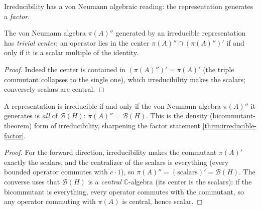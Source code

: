Irreducibility has a von Neumann algebraic reading: the representation generates a \emph{factor}.

\begin{theorem}
    \label{thrm:irreducible-factor}
    \leanok
    The von Neumann algebra $\pi(A)''$ generated by an irreducible representation has \emph{trivial center}: an operator lies in the center $\pi(A)'' \cap (\pi(A)'')'$ if and only if it is a scalar multiple of the identity.
\end{theorem}
\begin{proof}
    \leanok
    Indeed the center is contained in $(\pi(A)'')' = \pi(A)'$ (the triple commutant collapses to the single one), which irreducibility makes the scalars; conversely scalars are central.
\end{proof}

\begin{theorem}
    \label{thrm:irreducible-generates-all}
    \leanok
    A representation is irreducible if and only if the von Neumann algebra $\pi(A)''$ it generates is \emph{all} of $\mathcal{B}(H)$: $\pi(A)'' = \mathcal{B}(H)$. This is the density (bicommutant-theorem) form of irreducibility, sharpening the factor statement \ref{thrm:irreducible-factor}.
\end{theorem}
\begin{proof}
    \leanok
    For the forward direction, irreducibility makes the commutant $\pi(A)'$ exactly the scalars, and the centralizer of the scalars is everything (every bounded operator commutes with $c \cdot 1$), so $\pi(A)'' = (\text{scalars})' = \mathcal{B}(H)$. The converse uses that $\mathcal{B}(H)$ is a \emph{central} $\mathbb{C}$-algebra (its center is the scalars): if the bicommutant is everything, every operator commutes with the commutant, so any operator commuting with $\pi(A)$ is central, hence scalar.
\end{proof}

